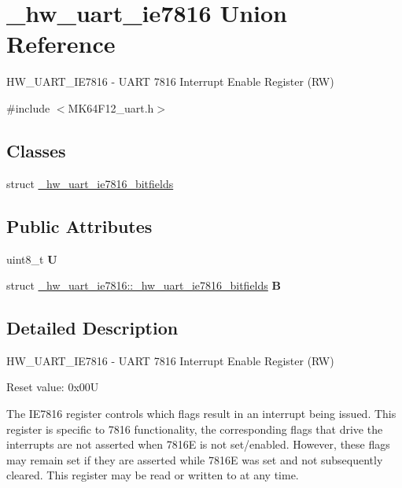 \hypertarget{union__hw__uart__ie7816}{}\section{\+\_\+hw\+\_\+uart\+\_\+ie7816 Union Reference}
\label{union__hw__uart__ie7816}


H\+W\+\_\+\+U\+A\+R\+T\+\_\+\+I\+E7816 -\/ U\+A\+RT 7816 Interrupt Enable Register (RW)  




{\ttfamily \#include $<$M\+K64\+F12\+\_\+uart.\+h$>$}

\subsection*{Classes}
\begin{DoxyCompactItemize}
\item 
struct \hyperlink{struct__hw__uart__ie7816_1_1__hw__uart__ie7816__bitfields}{\+\_\+hw\+\_\+uart\+\_\+ie7816\+\_\+bitfields}
\end{DoxyCompactItemize}
\subsection*{Public Attributes}
\begin{DoxyCompactItemize}
\item 
uint8\+\_\+t {\bfseries U}\hypertarget{union__hw__uart__ie7816_a065c133b9f986057a7f95da9f290ffcf}{}\label{union__hw__uart__ie7816_a065c133b9f986057a7f95da9f290ffcf}

\item 
struct \hyperlink{struct__hw__uart__ie7816_1_1__hw__uart__ie7816__bitfields}{\+\_\+hw\+\_\+uart\+\_\+ie7816\+::\+\_\+hw\+\_\+uart\+\_\+ie7816\+\_\+bitfields} {\bfseries B}\hypertarget{union__hw__uart__ie7816_a9cbfab9f59163b516b7f17174dfec7e4}{}\label{union__hw__uart__ie7816_a9cbfab9f59163b516b7f17174dfec7e4}

\end{DoxyCompactItemize}


\subsection{Detailed Description}
H\+W\+\_\+\+U\+A\+R\+T\+\_\+\+I\+E7816 -\/ U\+A\+RT 7816 Interrupt Enable Register (RW) 

Reset value\+: 0x00U

The I\+E7816 register controls which flags result in an interrupt being issued. This register is specific to 7816 functionality, the corresponding flags that drive the interrupts are not asserted when 7816E is not set/enabled. However, these flags may remain set if they are asserted while 7816E was set and not subsequently cleared. This register may be read or written to at any time. 

